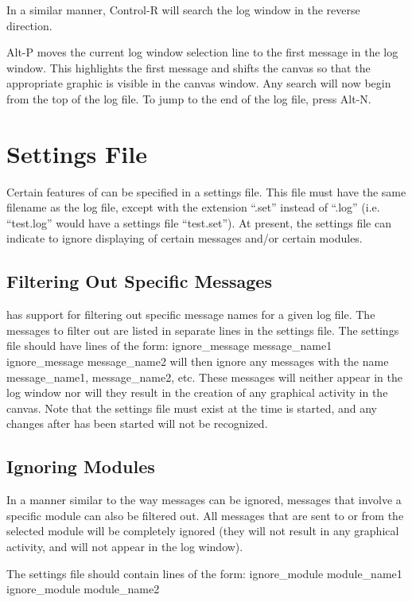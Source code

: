 In a similar manner, Control-R will search the log window in the reverse
direction.

Alt-P moves the current log window selection line to the first message in
the log window. This highlights the first message and
shifts the canvas so that the appropriate graphic is visible in the
canvas window.  Any search will now begin from the top of the log file. To
jump to the end of the log file, press Alt-N.

\section{Settings File}

Certain features of \comview{} can be specified in a settings file.  This file
must have the same filename as the log file, except with the extension
``.set'' instead of ``.log'' (i.e. ``test.log'' would have a settings file
``test.set'').  At present, the settings file can indicate to ignore
displaying of certain messages and/or certain modules.

\subsection{Filtering Out Specific Messages}

\comview{} has support for filtering out specific message names for a
given log file. The messages to filter out are listed in separate lines in the
settings file.  The settings file should have lines of the form:\newline
\newline
 ignore\_message message\_name1\newline
 ignore\_message message\_name2
\newline
\newline
\comview{} will then ignore any messages with the name message\_name1,
message\_name2, etc. These messages will neither appear in the log
window nor will they result in the creation of any graphical activity
in the canvas. Note that the settings file must exist at the time
\comview{} is started, and any changes after \comview{} has been started
will not be recognized.

\subsection{Ignoring Modules}

In a manner similar to the way messages can be ignored, messages that
involve a specific module can also be filtered out. All messages that
are sent to or from the selected module will be completely ignored
(they will not result in any graphical activity, and will not appear
in the log window).

The settings file should contain lines of the form:\newline
\newline
 ignore\_module module\_name1\newline
 ignore\_module module\_name2
\newline


